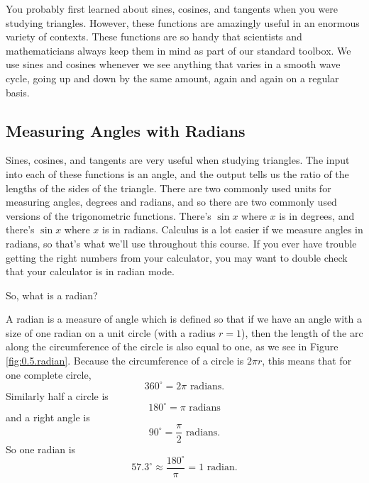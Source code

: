 You probably first learned about sines, cosines, and tangents when you were studying triangles.  However, these functions are amazingly useful in an enormous variety of contexts.  These functions are so handy that scientists and mathematicians always keep them in mind as part of our standard toolbox.  We use sines and cosines whenever we see anything that varies in a smooth wave cycle, going up and down by the same amount, again and again on a regular basis.





\subsection*{Measuring Angles with Radians}

Sines, cosines, and tangents are very useful when studying triangles.  The input into each
of these functions is an angle, and the output tells us the ratio of the lengths of the
sides of the triangle.  There are two commonly used units for measuring angles, degrees
and radians, and so there are two commonly used versions of the trigonometric functions.
There's $\sin x$ where $x$ is in degrees, and there's $\sin x$ where $x$ is in radians.
Calculus is a lot easier if we measure angles in radians, so that's what we'll use
throughout this course.  If you ever have trouble getting the right numbers from your
calculator, you may want to double check that your calculator is in radian mode.

So, what is a radian?  

\begin{definition}[radian]
    A radian is a measure of angle which is defined so that if we have an angle with
    a size of one radian on a unit circle (with a radius $r= 1$), then the length of the
    arc along the circumference of the circle is also equal to one, as we see in Figure
    \ref{fig:0.5.radian}.  Because the circumference of a circle is $2 \pi r$, this means
    that for one complete circle, 
    \[ 360^\circ = 2 \pi \text{ radians.} \]
    Similarly half a circle is
    \[ 180^\circ = \pi \text{ radians} \]
    and a right angle is 
    \[ 90^\circ = \frac{\pi}{2} \text{ radians.} \]  
    So one radian is 
    \[ 57.3^\circ \approx \frac{180^\circ}{\pi} = 1 \text{ radian}. \]
\end{definition}

% 

